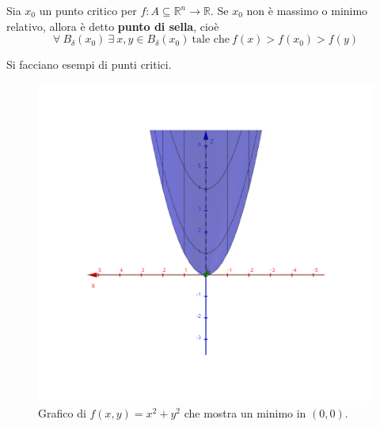 \begin{definition} \label{Def: Punto di sella}
    Sia $x_0$ un punto critico per $f:A \subseteq \mathbb{R}^n \to \mathbb{R}$. Se $x_0$ non è massimo o minimo relativo, allora è detto \textbf{punto di sella}, cioè
    \begin{equation}
        \forall\ B_\delta(x_0)\ \exists\ x,y \in B_\delta(x_0)\ \text{tale che}\ f(x)>f(x_0)>f(y)
    \end{equation} 
\end{definition}
\begin{example}
    Si facciano esempi di punti critici.
    \begin{figure}[H]
        \centering
        \begin{minipage}{0.26\textwidth}
            \centering
            \includegraphics[width=\textwidth]{Capitoli/Capitolo2/Minimo.png}
            \caption{Grafico di $f(x,y)=x^2+y^2$ che mostra un minimo in $(0,0)$.}
        \end{minipage}
        \hspace{1cm}
        \begin{minipage}{0.26\textwidth}
            \centering

\end{minipage}
\end{figure}
\end{example}
